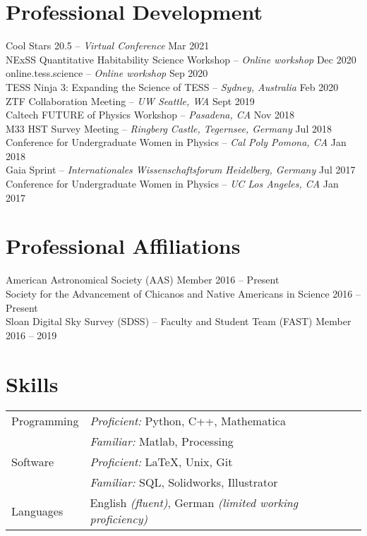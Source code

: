 \documentclass[margin,line]{resume}
\begin{document}
\begin{resume}
\section{\mysidestyle \textcolor{bcolor}{Professional Development}}
Cool Stars 20.5 -- \textit{Virtual Conference} \hfill Mar 2021 \\
NExSS Quantitative Habitability Science Workshop -- \textit{Online workshop} \hfill Dec 2020 \\
online.tess.science -- \textit{Online workshop} \hfill Sep 2020 \\
\newpage
TESS Ninja 3: Expanding the Science of TESS -- \textit{Sydney, Australia} \hfill Feb 2020 \\
ZTF Collaboration Meeting -- \textit{UW Seattle, WA} \hfill Sept 2019 \\
Caltech FUTURE of Physics Workshop -- \textit{Pasadena, CA} \hfill Nov 2018 \\
M33 HST Survey Meeting -- \textit{Ringberg Castle, Tegernsee, Germany} \hfill Jul 2018 \\
Conference for Undergraduate Women in Physics -- \textit{Cal Poly Pomona, CA}  \hfill Jan 2018 \\
Gaia Sprint -- \textit{Internationales Wissenschaftsforum Heidelberg, Germany}  \hfill Jul 2017 \\
Conference for Undergraduate Women in Physics -- \textit{UC Los Angeles, CA}  \hfill Jan 2017 



\section{\mysidestyle \textcolor{bcolor}{Professional Affiliations}}
American Astronomical Society (AAS) Member \hfill 2016 -- Present \\
Society for the Advancement of Chicanos and Native Americans in Science \hfill 2016 -- Present \\
Sloan Digital Sky Survey (SDSS) -- Faculty and Student Team (FAST) Member \hfill 2016 -- 2019 


\section{\mysidestyle \textcolor{bcolor}{Skills}} 

\noindent\begin{tabular}{@{}l|l}
  \multirow{1}{*}{{\sc Programming}} & \textit{Proficient:} Python, C++, Mathematica \\
    & \textit{Familiar:} Matlab, Processing \vspace{.1cm} \\
  \multirow{1}{*}{{\sc Software}} & \textit{Proficient:} \LaTeX, Unix, Git \\
    & \textit{Familiar:} SQL, Solidworks, Illustrator  \vspace{.1cm} \\
  \multirow{1}{*}{{\sc Languages}} & English \textit{(fluent)}, German \textit{(limited working proficiency)}
\end{tabular}


\end{resume}
\end{document}
